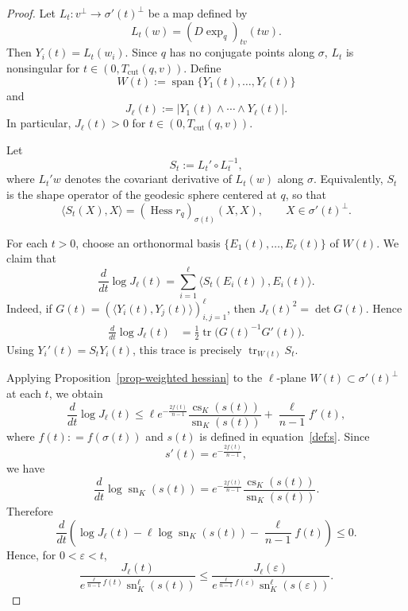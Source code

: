 \documentclass[psamsfonts]{amsart}
\theoremstyle{definition}
\theoremstyle{remark}
\numberwithin{equation}{section}
\begin{document}
\begin{proof}
Let $L_t:v^\perp\to \sigma'(t)^\perp$ be a map defined by
$$
L_t (w)=(D\exp_q)_{tv}(t w).
$$
Then $Y_i(t)=L_t(w_i)$. Since $q$ has no conjugate points along $\sigma$,
$L_t$ is nonsingular for $t \in (0, T_{\mathrm{cut}}(q,v))$. Define
$$
W(t):=
\operatorname{span}\{Y_1(t),\ldots,Y_\ell(t)\}
$$
and
$$
J_\ell(t):=|Y_1(t)\wedge\cdots\wedge Y_\ell(t)|.
$$
In particular, $J_\ell (t) >0 $ for $t \in (0, T_{\mathrm{cut}}(q,v))$.


Let
$$
S_t:=L_t' \circ L_t^{-1},
$$
where $L_t'w$ denotes the covariant derivative of $L_t(w)$ along $\sigma$.
Equivalently, $S_t$ is the shape operator of the geodesic
sphere centered at $q$, so that
$$
\langle S_t(X),X\rangle
=
\left(\operatorname{Hess} r_q\right)_{\sigma(t)}(X,X),
\qquad X\in \sigma'(t)^\perp.
$$

For each $t >0$, choose an orthonormal basis $\{E_1(t),\ldots,E_\ell(t)\}$  of $W(t)$.
We claim that 
$$
\frac{d}{dt}\log J_\ell(t)
=
\sum_{i=1}^\ell \langle S_t(E_i(t)),E_i(t)\rangle .
$$
Indeed, if $G(t)=(\langle Y_i(t),Y_j(t)\rangle)_{i,j=1}^\ell$, then
$J_\ell(t)^2=\det G(t)$. Hence
\begin{align*}
\frac{d}{dt}\log J_\ell(t)
&=
\frac12\operatorname{tr}\bigl(G(t)^{-1}G'(t)\bigr).
\end{align*}
Using $Y_i'(t)=S_tY_i(t)$, this trace is precisely
$\operatorname{tr}_{W(t)}S_t$.

Applying Proposition~\ref{prop-weighted hessian} to the $\ell$-plane
$W(t)\subset \sigma'(t)^\perp$ at each $t$, we obtain
$$
\frac{d}{dt}\log J_\ell(t)
\le
\ell e^{-\frac{2f(t)}{n-1}}
\frac{\operatorname{cs}_K(s(t))}{\operatorname{sn}_K(s(t))}
+
\frac{\ell}{n-1}f'(t),
$$
where $f(t) : = f(\sigma(t))$ and $s(t)$ is defined in equation~\eqref{def:s}.
Since
$$
s'(t)=e^{-\frac{2f(t)}{n-1}},
$$
we have
$$
\frac{d}{dt}\log \operatorname{sn}_K(s(t))
=
e^{-\frac{2f(t)}{n-1}}
\frac{\operatorname{cs}_K(s(t))}{\operatorname{sn}_K(s(t))}.
$$
Therefore
$$
\frac{d}{dt}
\left(
\log J_\ell(t)
-
\ell\log \operatorname{sn}_K(s(t))
-
\frac{\ell}{n-1}f(t)
\right)
\le 0.
$$
Hence, for $0<\varepsilon<t$,
$$
\frac{J_\ell(t)}
{e^{\frac{\ell}{n-1}f(t)}\operatorname{sn}_K^\ell(s(t))}
\le
\frac{J_\ell(\varepsilon)}
{e^{\frac{\ell}{n-1}f(\varepsilon)}
\operatorname{sn}_K^\ell(s(\varepsilon))}.
$$


\end{proof}
\end{document}
